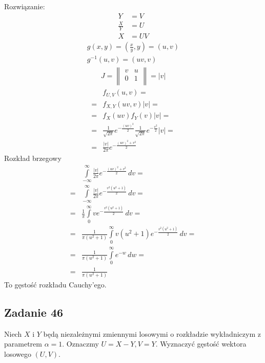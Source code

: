 Rozwiązanie:
\begin{align*}
Y&=V\\
\tfrac{X}{Y}&=U\\
X&=UV
\end{align*}
\begin{gather*}
g(x,y)=(\tfrac{x}{y},y)=(u,v)\\
g^{-1}(u,v)=(uv,v)
\end{gather*}
\begin{gather*}
J=
\begin{Vmatrix}
 v & u \\
 0 & 1 \\
\end{Vmatrix}
=|v|
\end{gather*}
\begin{align*}
&f_{U,V}(u,v)
=\\=&
f_{X,Y}(uv,v)|v|
=\\=&
f_X(uv)f_Y(v)|v|
=\\=&
\frac{1}{\sqrt{2 \pi }}e^{-\frac{(uv)^2}{2}}\frac{1}{\sqrt{2 \pi }}e^{-\frac{v^2}{2}}|v|
=\\=&
\frac{|v|}{2 \pi} e^{-\frac{(uv)^2+v^2}{2}}
\end{align*}
Rozkład brzegowy
\begin{align*}
&\int\limits_{-\infty }^{\infty }
\frac{|v|}{2 \pi}e^{-\frac{(uv)^2+v^2}{2}}\,dv
=\\=&
\int\limits_{-\infty }^{\infty }
\frac{|v|}{2 \pi}e^{-\frac{ v^2\left(u^2+1\right) }{2}}\,dv
=\\=&
\frac{1}{\pi}\int\limits_{0}^{\infty }
 ve^{-\frac{ v^2\left(u^2+1\right) }{2}}\,dv
=\\=&
 \frac{1}{\pi(u^2+1)}\int\limits_{0}^{\infty }
v(u^2+1)e^{-\frac{ v^2\left(u^2+1\right) }{2}}\,dv
=\\=&
\frac{1}{\pi(u^2+1)} \int\limits_{0}^{\infty }e^{-w}\,dw
=\\=&
\frac{1}{\pi(u^2+1)}
\end{align*}
To gęstość rozkładu Cauchy'ego.


\subsection*{Zadanie 46}
Niech $ X $ i $ Y $ będą niezależnymi zmiennymi losowymi o rozkładzie wykładniczym z parametrem $ \alpha=1 $. Oznaczmy $ U=X-Y,V=Y $. Wyznaczyć gęstość wektora losowego $ (U,V) $.

